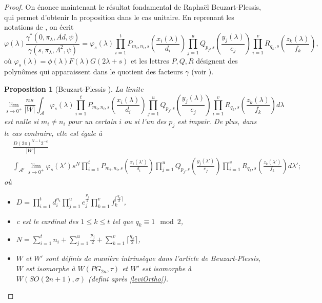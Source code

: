 \documentclass{amsart}
\newtheorem{proposition}{Proposition}[section]
\begin{document}
\begin{proof}
On énonce maintenant le résultat fondamental de Raphaël Beuzart-Plessis, qui permet d'obtenir la proposition dans le cas unitaire. En reprenant les notations de \cite{beuzart-plessis}, on écrit
\begin{equation}
\varphi(\lambda) \frac{\gamma^*(0, \pi_\lambda, \overline{Ad}, \psi)}{\gamma(s, \pi_\lambda, \Lambda^2, \psi)} = \varphi_s(\lambda) 
\prod_{i=1}^t P_{m_i,n_i,s}(\frac{x_i(\lambda)}{d_i}) \prod_{j=1}^u Q_{p_j,s}(\frac{y_j(\lambda)}{e_j}) \prod_{i=1}^v R_{q_k,s}(\frac{z_k(\lambda)}{f_k}),
\end{equation}
où $\varphi_s(\lambda) = \phi(\lambda) F(\lambda) G(2\lambda+s)$ et les lettres $P, Q, R$ désignent des polynômes qui apparaissent dans le quotient des facteurs $\gamma$ (voir \cite[section 3]{beuzart-plessis}).
\begin{proposition}[Beuzart-Plessis \cite{beuzart-plessis}]
\label{beuzart-plessis}
La limite
\begin{equation}
\lim_{s \rightarrow 0^+}  \frac{n s}{|W|} \int_{\mathcal{A}} \varphi_s(\lambda) 
\prod_{i=1}^t P_{m_i,n_i,s}(\frac{x_i(\lambda)}{d_i}) \prod_{j=1}^u Q_{p_j,s}(\frac{y_j(\lambda)}{e_j}) \prod_{i=1}^v R_{q_k,s}(\frac{z_k(\lambda)}{f_k}) d\lambda
\end{equation}
est nulle si $m_i \neq n_i$ pour un certain $i$ ou si l'un des $p_j$ est impair. De plus, dans le cas contraire, elle est égale à
\begin{equation}
\begin{split}
&\frac{D(2\pi)^{N-1}2^{-c}}{|W'|} \\
&\int_{\mathcal{A}'} \lim_{s \rightarrow 0^+} \varphi_s(\lambda') s^N \prod_{i=1}^t P_{m_i,n_i,s}(\frac{x_i(\lambda')}{d_i}) \prod_{j=1}^u Q_{p_j,s}(\frac{y_j(\lambda')}{e_j}) \prod_{i=1}^v R_{q_k,s}(\frac{z_k(\lambda')}{f_k}) d\lambda';
\end{split}
\end{equation}
où
\begin{itemize}
\item $D = \prod_{i=1}^t d_i^{n_i} \prod_{j=1}^u e_j^{\frac{p_j}{2}} \prod_{k=1}^v f_k^{\lceil \frac{q_k}{2} \rceil}$,
\item c est le cardinal des $1 \leq k \leq t$ tel que $q_k \equiv 1 \mod 2$,
\item $N = \sum_{i=1}^t n_i + \sum_{j=1}^u \frac{p_j}{2} + \sum_{k=1}^v \lceil \frac{q_k}{2} \rceil$,
\item $W$ et $W'$ sont définis de manière intrinsèque dans l'article de Beuzart-Plessis, $W$ est isomorphe à $W(PG_{2n}, \tau)$ et $W'$ est isomorphe à $W(SO(2n+1), \sigma)$ (defini après \ref{leviOrtho}).
\end{itemize}


\end{proposition}
\end{proof}
\end{document}
